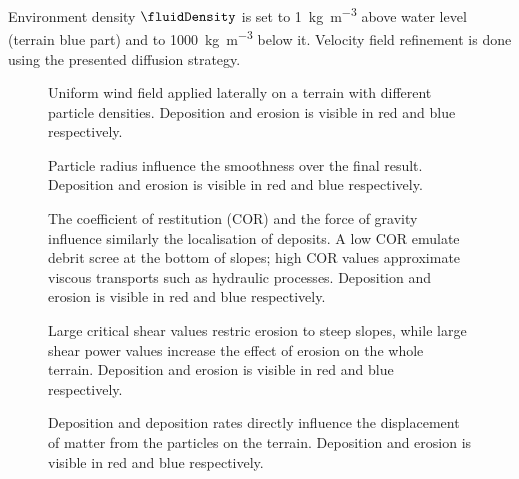Environment density $\fluidDensity$ is set to \SI{1}{\kilogram\per\cubic\meter} above water level (terrain blue part) and to \SI{1000}{\kilogram\per\cubic\meter} below it.  
Velocity field refinement is done using the presented diffusion strategy.


\begin{figure}
    \caption{Uniform wind field applied laterally on a terrain with different particle densities. Deposition and erosion is visible in red and blue respectively. }
    \label{fig:erosion-analysis-wind-density}
\end{figure}

\begin{figure}
    \caption{Particle radius influence the smoothness over the final result. Deposition and erosion is visible in red and blue respectively. }
    \label{fig:erosion-analysis-radius}
\end{figure}

\begin{figure}
    \caption{The coefficient of restitution (COR) and the force of gravity influence similarly the localisation of deposits. A low COR emulate debrit scree at the bottom of slopes; high COR values approximate viscous transports such as hydraulic processes. Deposition and erosion is visible in red and blue respectively. }
    \label{fig:erosion-analysis-cor-gravity}
\end{figure}

\begin{figure}
    \caption{Large critical shear values restric erosion to steep slopes, while large shear power values increase the effect of erosion on the whole terrain. Deposition and erosion is visible in red and blue respectively. }
    \label{fig:erosion-analysis-critical-shear-power}
\end{figure}

\begin{figure}
    \caption{Deposition and deposition rates directly influence the displacement of matter from the particles on the terrain. Deposition and erosion is visible in red and blue respectively. }
    \label{fig:erosion-analysis-deposition-erosion}
\end{figure}



